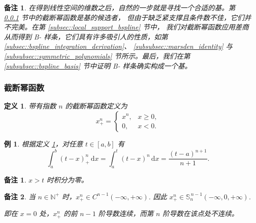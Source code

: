 \documentclass[a4paper]{ctexart}
\newtheorem{remark}{备注}
\newtheorem*{remark*}{备注}
\newtheorem{definition}[theorem]{定义} %
\newtheorem{example}[theorem]{例}
\numberwithin{theorem}{section}
\numberwithin{equation}{section}
\numberwithin{figure}{section}
\numberwithin{remark}{section}
\begin{document}
\begin{remark}
    \label{rem::after_dim_find_basis}
在得到线性空间的维数之后，自然的一步就是寻找一个合适的基。第 \ref{subsec::truncated_power_functions} 节中的截断幂函数是基的候选者，
但由于缺乏紧支撑且条件数不佳，它们并不完美。在第 \ref{subsec::local_support_bspline} 节中，
我们对截断幂函数应用差商从而得到 B- 样条，它们具有许多吸引人的性质，如第 \ref{subsec::bspline_integration_derivation}、
\ref{subsubsec::marsden_identity} 与 \ref{subsubsec::symmetric_polynomials} 节所示。最后，我们在第 \ref{subsubsec::bspline_basis} 节中证明 B- 样条确实构成一个基。
\end{remark}

\subsubsection{截断幂函数}
\label{subsec::truncated_power_functions}

\begin{definition}
    \label{def::truncated_power}
带有指数 $n$ 的截断幂函数定义为
\begin{equation}
    \label{eq::truncated_power}    
x^{n}_{+}=
\begin{cases}
x^{n}, & x\ge 0,\\
0,     & x<0.
\end{cases}
\end{equation}

\end{definition}

\begin{example}
    \label{ex::tp_int}
根据定义 \ref{def::truncated_power}，对任意 $t\in[a,b]$ 有
\begin{equation}
    \label{eq::tp_int}
\int_{a}^{b}(t-x)_{+}^{n}\,\mathrm{d}x
=\int_{a}^{t}(t-x)^{n}\,\mathrm{d}x
=\frac{(t-a)^{n+1}}{n+1}.
\end{equation}
\end{example}

\begin{remark*}
    $x > t$ 时积分为零。
\end{remark*}

\begin{remark}
    \label{rem::tp_smooth}
当 $n\in\mathbb{N}^{+}$ 时，$x_{+}^{n}\in C^{n-1}(-\infty,+\infty)$. 
因此
$x_{+}^{n}\in \mathbb{S}^{\,n-1}_{n}(-\infty,0,+\infty)$.

即在 $x = 0$ 处，$x_{+}^{n}$ 的前 $n-1$ 阶导数连续，而第 $n$ 阶导数在该点处不连续。
\end{remark}
\end{document}
